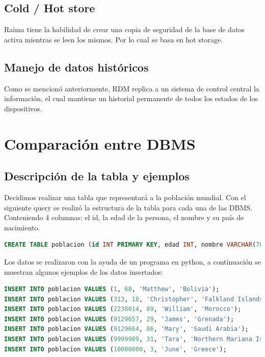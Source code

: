 \documentclass{acmart}
\begin{document}
\subsection{Cold / Hot store}
Raima tiene la habilidad de crear una copia de seguridad de la base de datos activa mientras se leen los mismos. Por lo cual se basa en hot storage. \cite{Rserv}
\subsection{Manejo de datos históricos}
Como se mencionó anteriormente, RDM replica a un sistema de control central la información, el cual mantiene un historial permanente de todos los estados de los dispositivos. \cite{Rwiki}

\newpage

\section{Comparación entre DBMS}
\subsection{Descripción de la tabla y ejemplos}
Decidimos realizar una tabla que representará a la población mundial. Con el siguiente query se realizó la estructura de la tabla para cada una de las DBMS. Conteniendo 4 columnas: el id, la edad de la persona, el nombre y su país de nacimiento. \\

\begin{lstlisting}[language=sql]
CREATE TABLE poblacion (id INT PRIMARY KEY, edad INT, nombre VARCHAR(70), pais VARCHAR(100));
\end{lstlisting}



Los datos se realizaron con la ayuda de un programa en python, a continuación se muestran algunos ejemplos de los datos insertados:

\begin{lstlisting}[language=sql]
INSERT INTO poblacion VALUES (1, 68, 'Matthew', 'Bolivia');
INSERT INTO poblacion VALUES (313, 18, 'Christopher', 'Falkland Islands (Malvinas)');
INSERT INTO poblacion VALUES (2238014, 89, 'William', 'Morocco');
INSERT INTO poblacion VALUES (9129657, 29, 'James', 'Grenada');
INSERT INTO poblacion VALUES (9129664, 86, 'Mary', 'Saudi Arabia');
INSERT INTO poblacion VALUES (9999989, 31, 'Tara', 'Northern Mariana Islands');
INSERT INTO poblacion VALUES (10000000, 3, 'June', 'Greece');
\end{lstlisting}
\end{document}
